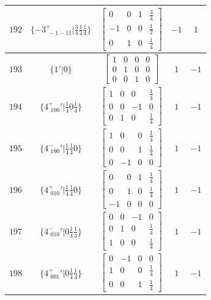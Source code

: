 \documentclass[fleqn,8pt]{jsarticle}
\begin{document}
\begin{longtable}{ccccc}
$ 192 $ & $ \{-3^{+}_{\,\,-1-11}|\frac{3}{4} \frac{1}{2} \frac{1}{4}\} $ & $ \begin{bmatrix} 0 & 0 & 1 & \frac{3}{4} \\ -1 & 0 & 0 & \frac{1}{2} \\ 0 & 1 & 0 & \frac{1}{4} \end{bmatrix} $ & $ -1 $ & $ 1 $ \\ \hline
$ 193 $ & $ \{1{}'|0\} $ & $ \begin{bmatrix} 1 & 0 & 0 & 0 \\ 0 & 1 & 0 & 0 \\ 0 & 0 & 1 & 0 \end{bmatrix} $ & $ 1 $ & $ -1 $ \\ \hline
$ 194 $ & $ \{4^{+}_{\,\,100}{}'|\frac{1}{4} 0 \frac{1}{4}\} $ & $ \begin{bmatrix} 1 & 0 & 0 & \frac{1}{4} \\ 0 & 0 & -1 & 0 \\ 0 & 1 & 0 & \frac{1}{4} \end{bmatrix} $ & $ 1 $ & $ -1 $ \\ \hline
$ 195 $ & $ \{4^{-}_{\,\,100}{}'|\frac{1}{4} \frac{1}{4} 0\} $ & $ \begin{bmatrix} 1 & 0 & 0 & \frac{1}{4} \\ 0 & 0 & 1 & \frac{1}{4} \\ 0 & -1 & 0 & 0 \end{bmatrix} $ & $ 1 $ & $ -1 $ \\ \hline
$ 196 $ & $ \{4^{+}_{\,\,010}{}'|\frac{1}{4} \frac{1}{4} 0\} $ & $ \begin{bmatrix} 0 & 0 & 1 & \frac{1}{4} \\ 0 & 1 & 0 & \frac{1}{4} \\ -1 & 0 & 0 & 0 \end{bmatrix} $ & $ 1 $ & $ -1 $ \\ \hline
$ 197 $ & $ \{4^{-}_{\,\,010}{}'|0 \frac{1}{4} \frac{1}{4}\} $ & $ \begin{bmatrix} 0 & 0 & -1 & 0 \\ 0 & 1 & 0 & \frac{1}{4} \\ 1 & 0 & 0 & \frac{1}{4} \end{bmatrix} $ & $ 1 $ & $ -1 $ \\ \hline
$ 198 $ & $ \{4^{+}_{\,\,001}{}'|0 \frac{1}{4} \frac{1}{4}\} $ & $ \begin{bmatrix} 0 & -1 & 0 & 0 \\ 1 & 0 & 0 & \frac{1}{4} \\ 0 & 0 & 1 & \frac{1}{4} \end{bmatrix} $ & $ 1 $ & $ -1 $ \\ \hline

\end{longtable}
\end{document}
